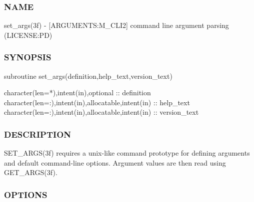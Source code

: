 \subsubsection*{N\+A\+ME}

set\+\_\+args(3f) -\/ \mbox{[}A\+R\+G\+U\+M\+E\+N\+TS\+:M\+\_\+\+C\+L\+I2\mbox{]} command line argument parsing (L\+I\+C\+E\+N\+SE\+:PD) 

\subsubsection*{S\+Y\+N\+O\+P\+S\+IS}

\begin{DoxyVerb} subroutine set_args(definition,help_text,version_text)

  character(len=*),intent(in),optional  :: definition
  character(len=:),intent(in),allocatable,intent(in) :: help_text
  character(len=:),intent(in),allocatable,intent(in) :: version_text
\end{DoxyVerb}
 \subsubsection*{D\+E\+S\+C\+R\+I\+P\+T\+I\+ON}

\begin{DoxyVerb} SET_ARGS(3f) requires a unix-like command prototype for defining
 arguments and default command-line options. Argument values are then
 read using GET_ARGS(3f).
\end{DoxyVerb}


\subsubsection*{O\+P\+T\+I\+O\+NS}

